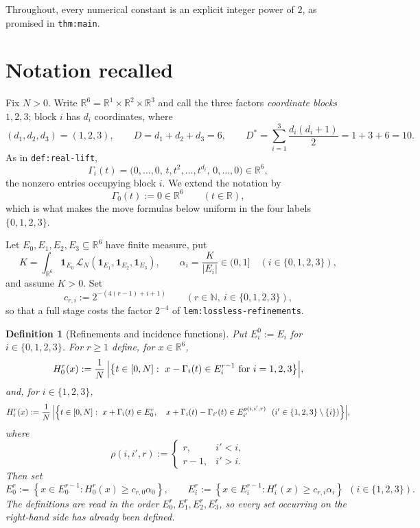 \documentclass[11pt]{article}
\newtheorem{definition}[theorem]{Definition}
\newcommand{\R}{\mathbb{R}}
\newcommand{\N}{\mathbb{N}}
\newcommand{\one}{\mathbf{1}}
\newcommand{\abs}[1]{\left|#1\right|}
\newcommand{\set}[1]{\left\{#1\right\}}
\newcommand{\indices}{\{1,2,3\}}
\newcommand{\Idx}{\{0,1,2,3\}}
\begin{document}
Throughout, every numerical constant is an explicit integer power of $2$, as
promised in \texttt{thm:main}.

\section{Notation recalled}
\label{sec:notation}

Fix $N>0$.  Write $\R^6=\R^1\times\R^2\times\R^3$ and call the three factors
\emph{coordinate blocks} $1,2,3$; block $i$ has $d_i$ coordinates, where
\[
  (d_1,d_2,d_3)=(1,2,3),\qquad D=d_1+d_2+d_3=6,\qquad
  D^\ast=\sum_{i=1}^3\frac{d_i(d_i+1)}2=1+3+6=10 .
\]
As in \texttt{def:real-lift},
\[
  \Gamma_i(t)=\bigl(0,\dots,0,\,t,t^2,\dots,t^{d_i},\,0,\dots,0\bigr)\in\R^6,
\]
the nonzero entries occupying block $i$.  We extend the notation by
\begin{equation}
  \label{eq:gamma-zero}
  \Gamma_0(t):=0\in\R^6 \qquad (t\in\R),
\end{equation}
which is what makes the move formulas below uniform in the four labels
$\Idx$.

Let $E_0,E_1,E_2,E_3\subseteq\R^6$ have finite measure, put
\[
  K=\int_{\R^6}\one_{E_0}\,\mathcal L_N(\one_{E_1},\one_{E_2},\one_{E_3}),
  \qquad
  \alpha_i=\frac{K}{\abs{E_i}}\in(0,1] \quad(i\in\Idx),
\]
and assume $K>0$.  Set
\begin{equation}
  \label{eq:c-constants}
  c_{r,i}:=2^{-(4(r-1)+i+1)}\qquad (r\in\N,\ i\in\Idx),
\end{equation}
so that a full stage costs the factor $2^{-4}$ of
\texttt{lem:lossless-refinements}.

\begin{definition}[Refinements and incidence functions]
  \label{def:refinements}
  Put $E_i^0:=E_i$ for $i\in\Idx$.  For $r\geq1$ define, for $x\in\R^6$,
  \[
    H_0^r(x):=\frac1N\,\Bigl|\set{t\in[0,N]:\ x-\Gamma_i(t)\in E_i^{r-1}\ \text{for } i=1,2,3}\Bigr|,
  \]
  and, for $i\in\indices$,
  \[
    H_i^r(x):=\frac1N\,\Bigl|\set{t\in[0,N]:\
      x+\Gamma_i(t)\in E_0^{r},\quad
      x+\Gamma_i(t)-\Gamma_{i'}(t)\in E_{i'}^{\rho(i,i',r)}\ \ (i'\in\indices\setminus\{i\})}\Bigr|,
  \]
  where
  \[
    \rho(i,i',r):=\begin{cases} r,& i'<i,\\ r-1,& i'>i.\end{cases}
  \]
  Then set
  \[
    E_0^r:=\set{x\in E_0^{r-1}: H_0^r(x)\geq c_{r,0}\alpha_0},
    \qquad
    E_i^r:=\set{x\in E_i^{r-1}: H_i^r(x)\geq c_{r,i}\alpha_i}\ \ (i\in\indices).
  \]
  The definitions are read in the order $E_0^r,E_1^r,E_2^r,E_3^r$, so every set
  occurring on the right-hand side has already been defined.
\end{definition}
\end{document}
